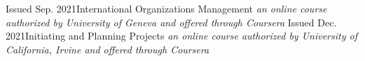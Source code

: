 \vspace*{.5em}
\begin{experiences}
\certification
{Issued Sep. 2021}{International Organizations Management}
{}{\textit{an online course authorized by University of Geneva and offered through Coursera}}
\certification
{Issued Dec. 2021}{Initiating and Planning Projects}
{}
{\textit{an online course authorized by University of California, Irvine and offered through Coursera}}
\end{experiences}
